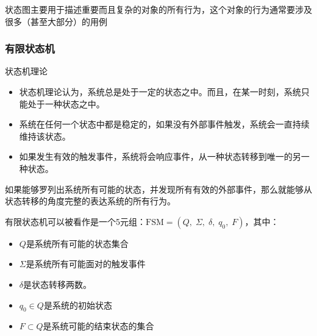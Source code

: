 状态图主要用于描述重要而且复杂的对象的所有行为，这个对象的行为通常要涉及很多（甚至大部分）的用例

\subsubsection{有限状态机}
状态机理论
\begin{itemize}
    \item 状态机理论认为，系统总是处于一定的状态之中。而且，在某一时刻，系统只能处于一种状态之中。
    \item 系统在任何一个状态中都是稳定的，如果没有外部事件触发，系统会一直持续维持该状态。
    \item 如果发生有效的触发事件，系统将会响应事件，从一种状态转移到唯一的另一种状态。
\end{itemize}

如果能够罗列出系统所有可能的状态，并发现所有有效的外部事件，那么就能够从状态转移的角度完整的表达系统的所有行为。

有限状态机可以被看作是一个5元组：$\mathrm{FSM}=(Q,\; \Sigma,\; \delta,\; q_0,\; F)$，其中：
\vspace{-0.8em}
\begin{multicols}{2}
    \begin{itemize}
        \item $Q$是系统所有可能的状态集合
        \item $\Sigma$是系统所有可能面对的触发事件
        \item $\delta$是状态转移两数。
        \item $q_0\in Q$是系统的初始状态
        \item $F\subset Q$是系统可能的结束状态的集合
    \end{itemize}
\end{multicols}
\vspace{-1em}

